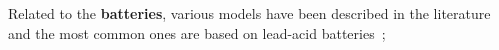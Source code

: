 Related to the \textbf{batteries}, various models have been described in the literature and the most common ones are based on lead-acid batteries~\cite{Copetti,Pinho};
%
%
%
%
%

